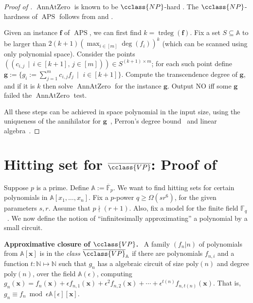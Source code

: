 \documentclass{toc}
\newcommand{\F}{\mathbb{F}}
\newcommand{\aff}{\mathbb{A}}
\DeclareMathOperator{\trdeg}{\mathrm{trdeg}}
\newcommand{\ol}[1]{\overline{#1}}
\newcommand{\NP}{\cclass{NP}\xspace}  %
\newcommand{\VP}{\cclass{VP}\xspace}  %
\newcommand{\VPbar}{\overline{\VP}\xspace}  %
\DeclareMathOperator{\APS}{\mathrm{APS}\xspace} %
\DeclareMathOperator{\AnnAtZero}{\mathrm{AnnAtZero}\xspace} %
\begin{document}
%
%
\begin{proof}[Proof of ]
$\AnnAtZero$ is known to be $\NP$-hard \cite{Kay09}. The $\NP$-hardness of $\APS$ follows from  and .

Given an instance $\mathbf f$ of $\APS$, we can first find $k=\trdeg(\mathbf f)$. Fix a 
%
set %
$S\subseteq \aff$ to be larger than $2(k+1)(\max_{i\in [m]}\deg(f_i))^k$ (which can be scanned using only 
%
polynomial space). %
Consider the points $\left(\left(c_{i,j} \,\mid\, i\in [k+1],\, j\in [m] \right)\right)\in S^{(k+1)\times m}$; for each such point define $\mathbf g:= \big\{g_i:= \sum_{j=1}^m c_{i,j} f_j \,\mid$ $i\in[k+1] \big\}$.   
Compute the transcendence degree of $\mathbf g$, and if it is $k$ then solve $\AnnAtZero$ for the instance $\mathbf g$. 
Output NO iff some $\mathbf g$ failed the $\AnnAtZero$ test.

All these steps can be achieved in space polynomial in the input size, using the uniqueness of the annihilator for $\mathbf g$~\cite[Theorem~47]{Mat80}, Perron's degree bound~\cite{Plo05} and linear algebra~\cite{C76, BGH82, Mul87}.
\end{proof}
%
%
\section{Hitting set for \texorpdfstring{$\VPbar$}{VPbar}: Proof of } \label{sec-hsg}

Suppose $p$ is a prime. Define $\aff:=\ol{\F}_p$. We want to find hitting sets for certain polynomials in $\aff[x_1,\dots,x_n]$. Fix a $p$-power $q\ge\Omega(sr^6)$, for the given parameters $s, r$. Assume that $p\nmid(r+1)$. Also, fix a model for the finite field $\F_q$~\cite{AL86}. We now define the notion of ``infinitesimally approximating'' a polynomial by a small circuit.

\smallskip\noindent
%
%
\textbf{Approximative closure of $\VP$.}~\cite{bringmann2017algebraic}
A family $(f_n|n)$ of polynomials from $\aff[\mathbf x]$ is in the \emph{class
%
%
$\VPbar_\aff$}       %
if there are polynomials $f_{n,i}$ and a function $t:\mathbb{N} \mapsto \mathbb{N}$ such that $g_n$  has a 
%
algebraic circuit of  size $\mathrm{poly}(n)$ and  degree $\mathrm{poly}(n)$, %
over the field $\aff(\epsilon)$, computing $g_n(\mathbf x)= f_n(\mathbf x)+ \epsilon f_{n,1}(\mathbf x)+ {\epsilon}^2 f_{n,2}(\mathbf x)+ \cdots+ {\epsilon}^{t(n)} f_{n,t(n)}(\mathbf x)$. That is, $g_n \equiv f_n \bmod{\epsilon\aff[\epsilon][\mathbf x]}$.
  
\end{document}
